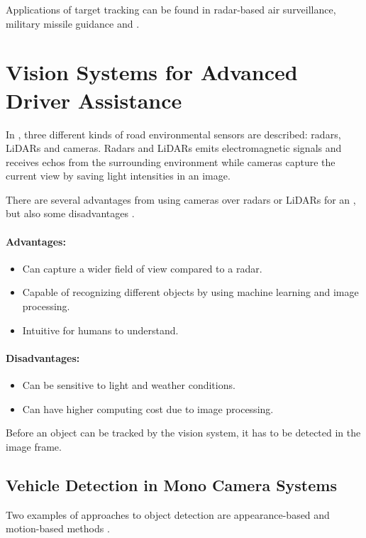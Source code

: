 Applications of target tracking can be found in \eg radar-based air surveillance, military missile guidance and \abbrADAS.

\section{Vision Systems for Advanced Driver Assistance}
In \citep{Sivaraman:2013}, three different kinds of road environmental sensors are described: radars, LiDARs and cameras.
Radars and LiDARs emits electromagnetic signals and receives echos from the surrounding environment while cameras capture the current view by saving light intensities in an image.

There are several advantages from using cameras over radars or LiDARs for an \abbrADAS, but also some disadvantages \cite{Sivaraman:2013}.

\paragraph{Advantages:}
\begin{itemize}
	\item Can capture a wider field of view compared to a radar.
	\item Capable of recognizing different objects by using machine learning and image processing.
	\item Intuitive for humans to understand.
\end{itemize}

\paragraph{Disadvantages:}
\begin{itemize}
	\item Can be sensitive to light and weather conditions.
	\item Can have higher computing cost due to \eg image processing.
\end{itemize}

Before an object can be tracked by the vision system, it has to be detected in the image frame.

\subsection{Vehicle Detection in Mono Camera Systems}
\label{sec:objectdetection}
Two examples of approaches to object detection are appearance-based and motion-based methods \citep{Sivaraman:2013}.

